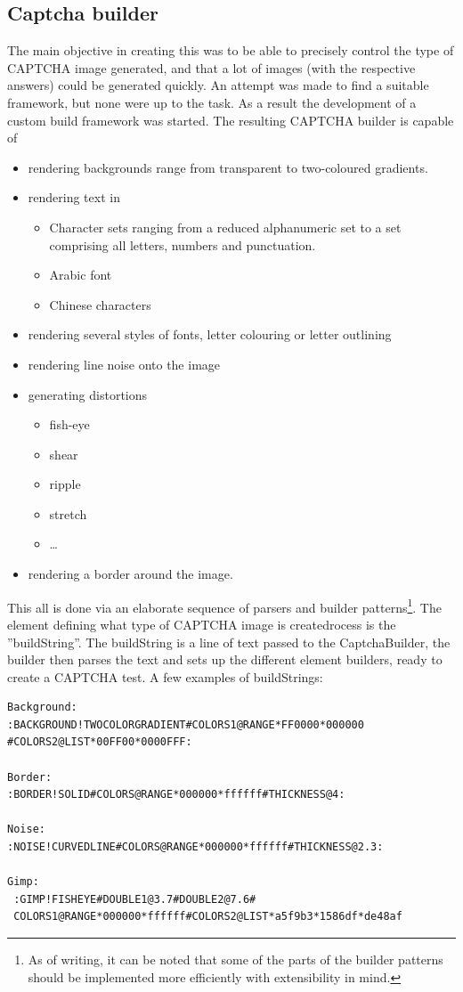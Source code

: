 \documentclass[pdftex,a4paper,12pt,twoside]{report}
\theoremstyle{plain} \newtheorem{theorem}{Theorem} \newtheorem{proposition}{Proposition} \newtheorem{lemma}{Lemma} \newtheorem*{corollary}{Corollary}
\theoremstyle{definition} \newtheorem{definition}{Definition} \newtheorem{conjecture}{Conjecture} \newtheorem*{example}{Example} \newtheorem{algorithm}{Algorithm}
\theoremstyle{remark} \newtheorem*{remark}{Remark} \newtheorem*{note}{Note} \newtheorem{case}{Case}
\begin{document}
\subsection{Captcha builder}
The main objective in creating this was to be able to precisely control the type of CAPTCHA image generated, and that a lot of images (with the respective answers) could be generated quickly. An attempt was made to find a suitable framework, but none were up to the task. As a result the development of a custom build framework was started. The resulting CAPTCHA builder is capable of
\begin{itemize}
\item rendering backgrounds range from transparent to two-coloured gradients.
\item rendering text in
	\begin{itemize}
	\item Character sets ranging from a reduced alphanumeric set to a set comprising all letters, numbers and punctuation.
	\item Arabic font
	\item Chinese characters
	\end{itemize}
\item rendering several styles of fonts, letter colouring or letter outlining
\item rendering line noise onto the image
\item generating distortions
	\begin{itemize}
	\item fish-eye
	\item shear
	\item ripple
	\item stretch
	\item \ldots
	\end{itemize}
\item rendering a border around the image.
\end{itemize}
This all is done via an elaborate sequence of parsers and builder patterns\footnote{As of writing, it can be noted that some of the parts of the builder patterns should be implemented more efficiently with extensibility in mind.}. The element defining what type of CAPTCHA image is createdrocess is the ''buildString''. The buildString is a line of text passed to the CaptchaBuilder, the builder then parses the text and sets up the different element builders, ready to create a CAPTCHA test. A few examples of buildStrings: 
\begin{verbatim}
Background:
:BACKGROUND!TWOCOLORGRADIENT#COLORS1@RANGE*FF0000*000000
#COLORS2@LIST*00FF00*0000FFF:

Border:
:BORDER!SOLID#COLORS@RANGE*000000*ffffff#THICKNESS@4:

Noise:
:NOISE!CURVEDLINE#COLORS@RANGE*000000*ffffff#THICKNESS@2.3:

Gimp:
 :GIMP!FISHEYE#DOUBLE1@3.7#DOUBLE2@7.6#
 COLORS1@RANGE*000000*ffffff#COLORS2@LIST*a5f9b3*1586df*de48af
\end{verbatim}
\end{document}
